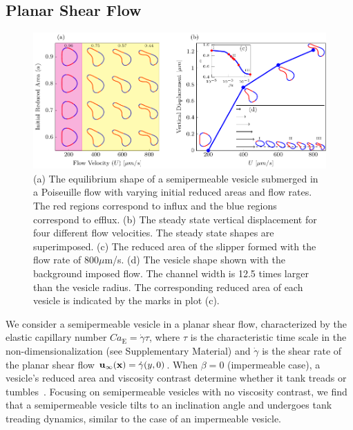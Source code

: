 \documentclass[9pt,twocolumn,twoside,lineno]{pnas-new}
\newif\ifTikz
\begin{document}
\subsection*{Planar Shear Flow}
\begin{figure}[hbp]
  \centering
  \ifTikz
  
  \else
  \includegraphics{figures/parabolicComposite.pdf}
  \fi
  \caption{\label{fig:parabolicComposite} (a) The equilibrium shape of
  a semipermeable vesicle submerged in a Poiseuille flow with varying
  initial reduced areas and flow rates. The red regions correspond to
  influx and the blue regions correspond to efflux. (b) The steady
  state vertical displacement for four different flow velocities. The
  steady state shapes are superimposed. (c) The reduced area of the
  slipper formed with the flow rate of $800 \mu$m/s. (d) The vesicle
  shape shown with the background imposed flow. The channel width is
  12.5 times larger than the vesicle radius. The corresponding reduced
  area of each vesicle is indicated by the marks in plot (c).}
\end{figure}

We consider a semipermeable vesicle in a planar shear flow, characterized by the elastic capillary number
$Ca_\mathrm{E}=\dot{\gamma}\tau$, where $\tau$ is the characteristic time scale in the non-dimensionalization (see Supplementary Material) and
$\dot{\gamma}$ is the shear rate of the planar shear flow
$\mathbf{u}_{\infty}(\mathbf{x}) = \dot{\gamma} (y,0)$.
 When $\beta=0$ (impermeable
case), a vesicle's reduced area and viscosity contrast determine whether
it tank treads or tumbles~\cite{fin-lam-sei-gom2008,
kra-win-sei-lip1996}. Focusing on semipermeable vesicles with no
viscosity contrast, we find that a semipermeable vesicle tilts to an
inclination angle and undergoes tank treading dynamics, similar to the
case of an impermeable vesicle.
\end{document}
